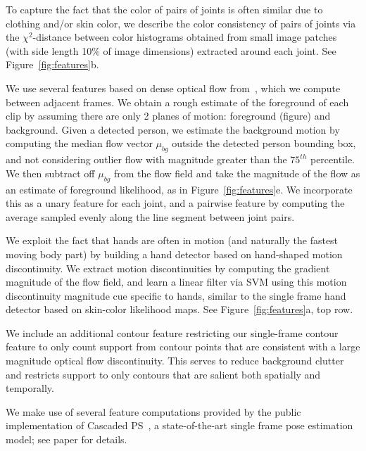  To capture the fact that the color of pairs of 
joints is often similar due to clothing and/or skin color, we describe the 
color consistency of pairs of joints via the $\chi^2$-distance between color 
histograms obtained from small image patches (with side length 10\% of image 
dimensions) extracted around each joint.  See Figure~\ref{fig:features}b.

We use several features based on dense optical flow from~\cite{optflow}, which we compute between 
adjacent frames. We obtain a rough estimate of the foreground of each clip by 
assuming there are only 2 planes of motion: foreground (figure) and background.  
Given a detected person, we estimate the background motion by computing the 
median flow vector $\mu_{bg}$ outside the detected person bounding box, and not 
considering outlier flow with magnitude greater than the $75^{th}$ percentile.  
We then subtract off $\mu_{bg}$ from the flow field and take the magnitude of 
the flow as an estimate of foreground likelihood, as in 
Figure~\ref{fig:features}e.  We incorporate this as a unary feature for each 
joint, and a pairwise feature by computing the average sampled evenly along 
the line segment between joint pairs.

  We exploit the fact that hands are often in 
motion (and naturally the fastest moving body part) by building a hand detector 
based on hand-shaped motion discontinuity. We extract motion discontinuities by 
computing the gradient magnitude of the flow field, and learn a linear filter 
via SVM using this motion discontinuity magnitude cue specific to hands, 
similar to the single frame hand detector based on skin-color likelihood maps.  
See Figure~\ref{fig:features}a, top row.


  We include an additional contour 
feature restricting our single-frame contour feature to only 
count support from contour points that are consistent with a large magnitude 
optical flow discontinuity.  This serves to reduce background clutter and 
restricts support to only contours that are salient both spatially and 
temporally. 

 We make use of 
several feature computations provided by the public implementation 
of Cascaded PS~\cite{sapp10cascades}, a state-of-the-art single frame pose estimation model; see paper for details.

